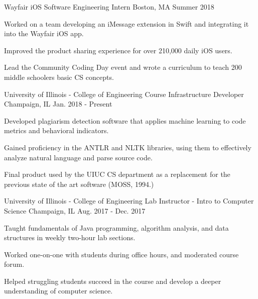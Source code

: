 
\begin{cventries}
\cventry
{Wayfair} %
{iOS Software Engineering Intern} %
{Boston, MA} %
{Summer 2018} %
{
	\begin{cvitems} %
		\item {Worked on a team developing an iMessage extension in Swift and integrating it into the Wayfair iOS app.}
		\item {Improved the product sharing experience for over 210,000 daily iOS users.}
		\item {Lead the Community Coding Day event and wrote a curriculum to teach 200 middle schoolers basic CS concepts. }
	\end{cvitems}
}
\cventry
{University of Illinois - College of Engineering} %
{Course Infrastructure Developer} %
{Champaign, IL} %
{Jan. 2018 - Present} %
{
    \begin{cvitems} %
        \item {Developed plagiarism detection software that applies machine learning to code metrics and behavioral indicators.}
        \item {Gained proficiency in the ANTLR and NLTK libraries, using them to effectively analyze natural language and parse source code.}
       \item {Final product used by the UIUC CS department as a replacement for the previous state of the art software (MOSS, 1994.)}
    \end{cvitems}
}
\cventry
{University of Illinois - College of Engineering} %
{Lab Instructor - Intro to Computer Science} %
{Champaign, IL} %
{Aug. 2017 - Dec. 2017} %
{
	\begin{cvitems} %
		\item {Taught fundamentals of Java programming, algorithm analysis, and data structures in weekly two-hour lab sections.}
		\item {Worked one-on-one with students during office hours, and moderated course forum.}
		\item {Helped struggling students succeed in the course and develop a deeper understanding of computer science.}
	\end{cvitems}
}
\end{cventries}
